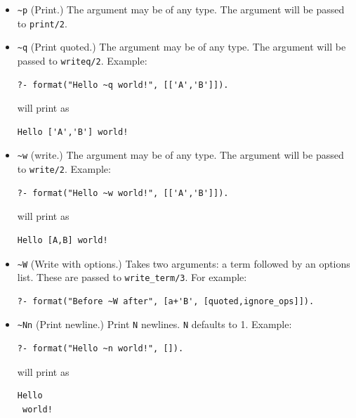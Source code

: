 \begin{description}
\begin{itemize}
\noindent
will print as

\begin{verbatim}
Hello +(+(a,b),c) world!
\end{verbatim}

\item \verb|~p|
(Print.) The argument may be of any type.  The argument will be passed to
{\tt print/2}.

\item \verb|~q|
(Print quoted.) The argument may be of any type.  The argument will be
passed to {\tt writeq/2}.  Example:

\begin{verbatim}
?- format("Hello ~q world!", [['A','B']]).
\end{verbatim}

\noindent
will print as

\begin{verbatim}
Hello ['A','B'] world!
\end{verbatim}

\item \verb|~w|
(write.) The argument may be of any type.  The argument will be passed
to {\tt write/2}.  Example:

\begin{verbatim}
?- format("Hello ~w world!", [['A','B']]).
\end{verbatim}

\noindent
will print as

\begin{verbatim}
Hello [A,B] world!
\end{verbatim}

\item \verb|~W|
(Write with options.) Takes two arguments: a term followed by an options
list.  These are passed to {\tt write\_term/3}.  For example:

\begin{verbatim}
?- format("Before ~W after", [a+'B', [quoted,ignore_ops]]).
\end{verbatim}

\item \verb|~Nn|
(Print newline.) Print {\tt N} newlines. {\tt N} defaults to 1.
Example:

\begin{verbatim}
?- format("Hello ~n world!", []).
\end{verbatim}

\noindent
will print as

\begin{verbatim}
Hello
 world!
\end{verbatim}


\end{itemize}
\end{description}
